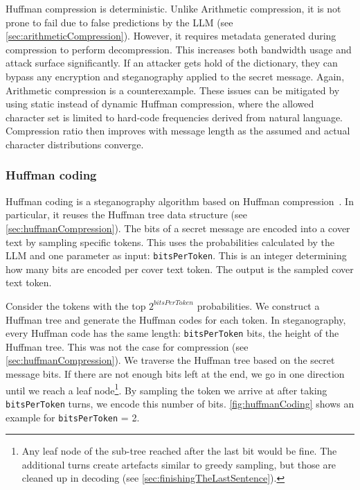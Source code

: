 Huffman compression is deterministic. Unlike Arithmetic compression, it is not prone to fail due to false predictions by the \gls{LLM} (see \cref{sec:arithmeticCompression}). However, it requires metadata generated during compression to perform decompression. This increases both bandwidth usage and attack surface significantly. If an attacker gets hold of the dictionary, they can bypass any encryption and steganography applied to the secret message. Again, Arithmetic compression is a counterexample. These issues can be mitigated by using static instead of dynamic Huffman compression, where the allowed character set is limited to hard-code frequencies derived from natural language. Compression ratio then improves with message length as the assumed and actual character distributions converge.

\subsubsection{Huffman coding}
\label{sec:huffmanCoding}
Huffman coding is a steganography algorithm based on Huffman compression~\cite{zieglerNeuralLinguisticSteganography2019,yangRNNStegaLinguisticSteganography2019}. In particular, it reuses the Huffman tree data structure (see \cref{sec:huffmanCompression}). The bits of a secret message are encoded into a cover text by sampling specific tokens. This uses the probabilities calculated by the \gls{LLM} and one parameter as input: \lstinline|bitsPerToken|. This is an integer determining how many bits are encoded per cover text token. The output is the sampled cover text token.

Consider the tokens with the top $ 2^{bitsPerToken} $ probabilities. We construct a Huffman tree and generate the Huffman codes for each token. In steganography, every Huffman code has the same length: \lstinline|bitsPerToken| bits, the height of the Huffman tree. This was not the case for compression (see \cref{sec:huffmanCompression}). We traverse the Huffman tree based on the secret message bits. If there are not enough bits left at the end, we go in one direction until we reach a leaf node\footnote{Any leaf node of the sub-tree reached after the last bit would be fine. The additional turns create artefacts similar to greedy sampling, but those are cleaned up in decoding (see \cref{sec:finishingTheLastSentence}).}. By sampling the token we arrive at after taking \lstinline|bitsPerToken| turns, we encode this number of bits. \cref{fig:huffmanCoding} shows an example for \lstinline|bitsPerToken| = 2.

